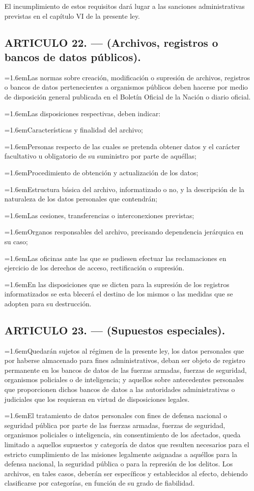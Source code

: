 \documentclass[10pt,a4paper]{article}
\newcommand{\articulo}[1]{\subsection{#1}}
\newcommand{\inciso}[2]{\par{\hangindent=1.6em\hangafter=1\makebox[1.6em][l]{#1}#2\par}}
\begin{document}
El incumplimiento de estos requisitos dará lugar a las sanciones administrativas previstas en el capítulo VI de la presente ley.

\articulo{ARTICULO 22. — (Archivos, registros o bancos de datos públicos).}
\inciso{1.}{Las normas sobre creación, modificación o supresión de archivos, registros o bancos de datos pertenecientes a organismos públicos deben hacerse por medio de disposición general publicada en el Boletín Oficial de la Nación o diario oficial.}

\inciso{2.}{Las disposiciones respectivas, deben indicar:}

\inciso{a)}{Características y finalidad del archivo;}

\inciso{b)}{Personas respecto de las cuales se pretenda obtener datos y el carácter facultativo u obligatorio de su suministro por parte de aquéllas;}

\inciso{c)}{Procedimiento de obtención y actualización de los datos;}

\inciso{d)}{Estructura básica del archivo, informatizado o no, y la descripción de la naturaleza de los datos personales que contendrán;}

\inciso{e)}{Las cesiones, transferencias o interconexiones previstas;}

\inciso{f)}{Organos responsables del archivo, precisando dependencia jerárquica en su caso;}

\inciso{g)}{Las oficinas ante las que se pudiesen efectuar las reclamaciones en ejercicio de los derechos de acceso, rectificación o supresión.}

\inciso{3.}{En las disposiciones que se dicten para la supresión de los registros informatizados se esta blecerá el destino de los mismos o las medidas que se adopten para su destrucción.}

\articulo{ARTICULO 23. — (Supuestos especiales).}
\inciso{1.}{Quedarán sujetos al régimen de la presente ley, los datos personales que por haberse almacenado para fines administrativos, deban ser objeto de registro permanente en los bancos de datos de las fuerzas armadas, fuerzas de seguridad, organismos policiales o de inteligencia; y aquellos sobre antecedentes personales que proporcionen dichos bancos de datos a las autoridades administrativas o judiciales que los requieran en virtud de disposiciones legales.}

\inciso{2.}{El tratamiento de datos personales con fines de defensa nacional o seguridad pública por parte de las fuerzas armadas, fuerzas de seguridad, organismos policiales o inteligencia, sin consentimiento de los afectados, queda limitado a aquellos supuestos y categoría de datos que resulten necesarios para el estricto cumplimiento de las misiones legalmente asignadas a aquéllos para la defensa nacional, la seguridad pública o para la represión de los delitos. Los archivos, en tales casos, deberán ser específicos y establecidos al efecto, debiendo clasificarse por categorías, en función de su grado de fiabilidad.}
\end{document}
